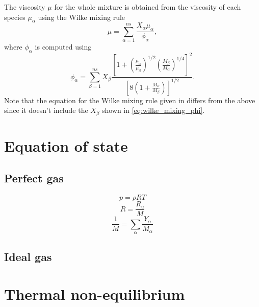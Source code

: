 \documentclass[oneside,a4paper,11pt]{report}
\begin{document}
The viscosity $\mu$ for the whole mixture is obtained from the viscosity of each species $\mu_\alpha$ using the Wilke mixing rule \cite{wilke1950}
\begin{equation}
\mu = \sum_{\alpha = 1}^{ns} \frac{X_\alpha \mu_\alpha}{\phi_\alpha},
\end{equation}
where $\phi_\alpha$ is computed using
\begin{equation}
\label{eq:wilke_mixing_phi}
    \phi_\alpha = \sum_{\beta = 1}^{ns} X_\beta \frac{ \left [ 1 + \left ( \frac{\mu_\alpha}{\mu_\beta} \right )^{1/2} \left ( \frac{M_\beta}{M_\alpha} \right)^{1/4} \right]^2}{ \left [ 8 \left ( 1 + \frac{M_\alpha}{M_\beta} \right ) \right ]^{1/2} }.
\end{equation}
Note that the equation for the Wilke mixing rule given in \cite{palmer2003} differs from the above since it doesn't include the $X_\beta$ shown in \cref{eq:wilke_mixing_phi}. 

\section{Equation of state}

\subsection{Perfect gas}
\begin{equation}
p = \rho R T 
\end{equation}
\begin{equation}
R = \frac{R_u}{M}
\end{equation}
\begin{equation}
\frac{1}{M} = \sum_\alpha \frac{Y_\alpha}{M_\alpha}
\end{equation}

\subsection{Ideal gas}

\section{Thermal non-equilibrium}
\end{document}

